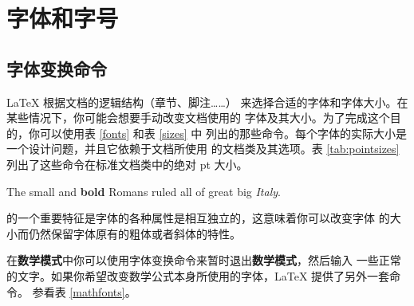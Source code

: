 \section{字体和字号}

\subsection{字体变换命令}
 \LaTeX{} 根据文档的逻辑结构（章节、脚注……）
来选择合适的字体和字体大小。在某些情况下，你可能会想要手动改变文档使用的
字体及其大小。为了完成这个目的，你可以使用表 \ref{fonts} 和表 \ref{sizes} 中
列出的那些命令。每个字体的实际大小是一个设计问题，并且它依赖于文档所使用
的文档类及其选项。表 \ref{tab:pointsizes} 列出了这些命令在标准文档类中的绝对 pt 大小。

\begin{example}
{\small The small and
\textbf{bold} Romans ruled}
{\Large all of great big
\textit{Italy}.}
\end{example}

\LaTeXe{} 的一个重要特征是字体的各种属性是相互独立的，这意味着你可以改变字体
的大小而仍然保留字体原有的粗体或者斜体的特性。

在\textbf{数学模式}中你可以使用字体变换命令来暂时退出\textbf{数学模式}，然后输入
一些正常的文字。如果你希望改变数学公式本身所使用的字体，\LaTeX{} 提供了另外一套命令。
参看表 \ref{mathfonts}。

